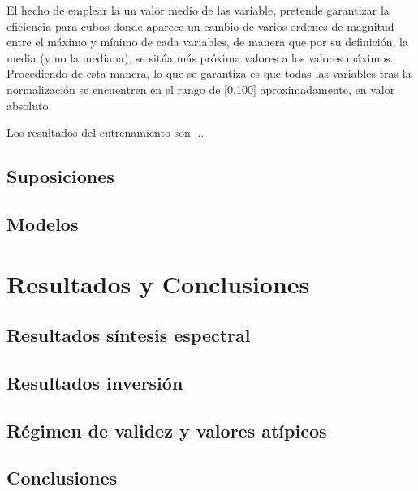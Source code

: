 \documentclass[8pt]{article}
\begin{document}
		El hecho de emplear la un valor medio de las variable, pretende garantizar la eficiencia para cubos donde aparece un cambio de varios ordenes de magnitud entre el máximo y mínimo de cada variables, de manera que por su definición, la media (y no la mediana), se sitúa más próxima valores a los valores máximos. Procediendo de esta manera, lo que se garantiza es que todas las variables tras la normalización se encuentren en el rango de [0,100] aproximadamente, en valor absoluto.\newline

		Los resultados del entrenamiento son ...
		
		
			\subsection{Suposiciones}
			
			\subsection{Modelos}
			
				
			
	
		\section{Resultados y Conclusiones}
		
		\subsection{Resultados síntesis espectral}

		\subsection{Resultados inversión}
		
		\subsection{Régimen de validez y valores atípicos}
			
		\subsection{Conclusiones}
\end{document}
